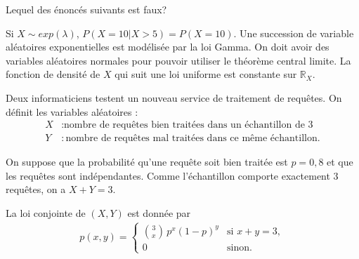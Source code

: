 \begin{questions}
\question[3]  Lequel des énoncés suivants est faux?

\begin{checkboxes}
    \choice Si $X\sim exp(\lambda)$, $P(X=10|X>5)=P(X=10)$.
    \choice Une succession de variable aléatoires exponentielles est modélisée par la loi Gamma.
    \correctchoice On doit avoir des variables aléatoires normales pour pouvoir utiliser le théorème central limite.
    \choice La fonction de densité de $X$ qui suit une loi uniforme est constante sur $\mathbb{R}_X$.
\end{checkboxes}

\pageblanche


\question\label{loiconjoite} 
Deux informaticiens testent un nouveau service de traitement de requêtes.  
On définit les variables aléatoires :
\begin{align*}
X&: \text{nombre de requêtes bien traitées dans un échantillon de 3}\\
Y&: \text{nombre de requêtes mal traitées dans ce même échantillon}.
\end{align*}

On suppose que la probabilité qu’une requête soit bien traitée est $p=0,8$ et que les requêtes sont indépendantes.  
Comme l’échantillon comporte exactement 3 requêtes, on a $X+Y=3$.

La loi conjointe de $(X,Y)$ est donnée par
\begin{align*}
p(x,y) = 
\begin{cases}
\displaystyle\binom{3}{x} \, p^x (1-p)^y & \text{si } x+y=3,\\[8pt]
0 & \text{sinon.}
\end{cases}
\end{align*}



\end{questions}
